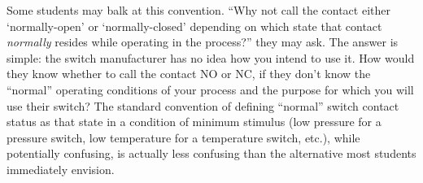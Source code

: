 Some students may balk at this convention.  ``Why not call the contact either `normally-open' or `normally-closed' depending on which state that contact {\it normally} resides while operating in the process?'' they may ask.  The answer is simple: the switch manufacturer has no idea how you intend to use it.  How would they know whether to call the contact NO or NC, if they don't know the ``normal'' operating conditions of your process and the purpose for which you will use their switch?  The standard convention of defining ``normal'' switch contact status as that state in a condition of minimum stimulus (low pressure for a pressure switch, low temperature for a temperature switch, etc.), while potentially confusing, is actually less confusing than the alternative most students immediately envision.











